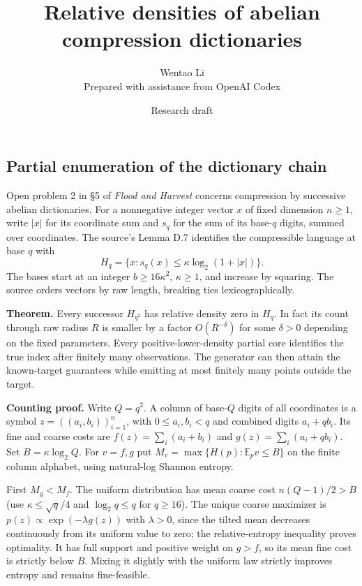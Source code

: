 \documentclass[11pt]{article}
\title{Relative densities of abelian compression dictionaries}
\author{Wentao Li\\{\small Prepared with assistance from OpenAI Codex}}
\date{Research draft}
\begin{document}
\maketitle
\subsection{Partial enumeration of the dictionary chain}\label{partial-enumeration-of-the-dictionary-chain}

Open problem 2 in §5 of \emph{Flood and Harvest} concerns compression by successive abelian dictionaries. For a nonnegative integer vector \(x\) of fixed dimension \(n\geq1\), write \(|x|\) for its coordinate sum and \(s_q\) for the sum of its base-\(q\) digits, summed over coordinates. The source's Lemma D.7 identifies the compressible language at base \(q\) with
\[H_q=\{x:s_q(x)\leq\kappa\log_2(1+|x|)\}.\]
The bases start at an integer \(b\geq16\kappa^2\), \(\kappa\geq1\), and increase by squaring. The source orders vectors by raw length, breaking ties lexicographically.

\textbf{Theorem.} Every successor \(H_{q^2}\) has relative density zero in \(H_q\). In fact its count through raw radius \(R\) is smaller by a factor \(O(R^{-\delta})\) for some \(\delta>0\) depending on the fixed parameters. Every positive-lower-density partial core identifies the true index after finitely many observations. The generator can then attain the known-target guarantees while emitting at most finitely many points outside the target.

\textbf{Counting proof.} Write \(Q=q^2\). A column of base-\(Q\) digits of all coordinates is a symbol \(z=((a_i,b_i))_{i=1}^n\), with \(0\leq a_i,b_i<q\) and combined digits \(a_i+qb_i\). Its fine and coarse costs are \(f(z)=\sum_i(a_i+b_i)\) and \(g(z)=\sum_i(a_i+qb_i)\). Set \(B=\kappa\log_2 Q\). For \(v=f,g\) put \(M_v=\max\{H(p):\mathbb E_p v\leq B\}\) on the finite column alphabet, using natural-log Shannon entropy.

First \(M_g<M_f\). The uniform distribution has mean coarse cost \(n(Q-1)/2>B\) (use \(\kappa\leq\sqrt q/4\) and \(\log_2 q\leq q\) for \(q\geq16\)). The unique coarse maximizer is \(p(z)\propto\exp(-\lambda g(z))\) with \(\lambda>0\), since the tilted mean decreases continuously from its uniform value to zero; the relative-entropy inequality proves optimality. It has full support and positive weight on \(g>f\), so its mean fine cost is strictly below \(B\). Mixing it slightly with the uniform law strictly improves entropy and remains fine-feasible.
\end{document}
